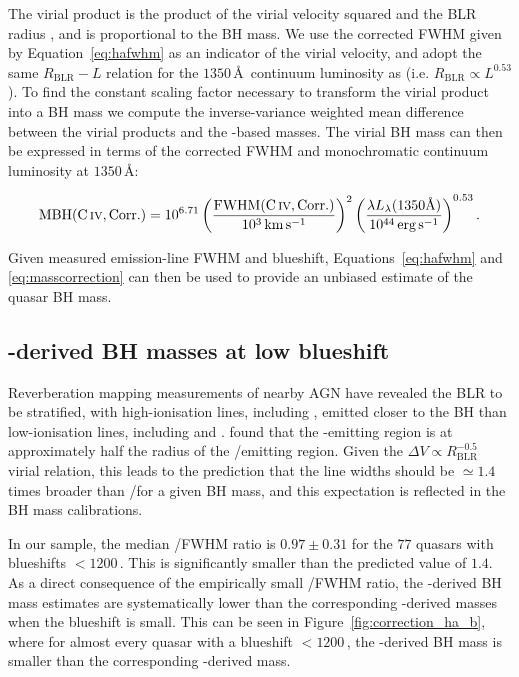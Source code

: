 The virial product is the product of the virial velocity squared and the BLR radius \citep[e.g.][]{shen13}, and is proportional to the BH mass. 
We use the corrected  FWHM given by Equation~\ref{eq:hafwhm} as an indicator of the virial velocity, and adopt the same $R_{\text{BLR}}-L$ relation for the $1350$\,\AA\, continuum luminosity as \citet{vestergaard06} (i.e. $R_{\text{BLR}} \propto L^{0.53}$). 
To find the constant scaling factor necessary to transform the virial product into a BH mass we compute the inverse-variance weighted mean difference between the virial products and the \hans-based masses. 
The virial BH mass can then be expressed in terms of the corrected  FWHM and monochromatic continuum luminosity at $1350$\,\AA:

\begingroup\makeatletter{}\check@mathfonts
\begin{eqnarray}
  \label{eq:masscorrection}
  \text{MBH}(\text{C}\,\textsc{iv}, \text{Corr.}) = 10^{6.71}\left( \frac{ \text{FWHM}(\text{C}\,\textsc{iv}, \text{Corr.})}{10^3 \,\text{km}\,\text{s}^{-1}} \right)^2 \left( \frac{\lambda L_{\lambda} (1350 \text{\AA}) }{10^{44} \,\text{erg}\,\text{s}^{-1}}  \right)^{0.53}.
\end{eqnarray}
\endgroup

\noindent Given measured  emission-line FWHM and blueshift, Equations~\ref{eq:hafwhm} and \ref{eq:masscorrection} can then be used to provide an unbiased estimate of the quasar BH mass.

\subsection{-derived BH masses at low  blueshift}

Reverberation mapping measurements of nearby AGN have revealed the BLR to be stratified, with high-ionisation lines, including , emitted closer to the BH than low-ionisation lines, including \ha and \hb \citep[e.g.][]{onken02}.
\citet{vestergaard06} found that the -emitting region is at approximately half the radius of the \hbns/\ha emitting region.
Given the $\Delta V \propto R_{\text{BLR}}^{-0.5}$ virial relation, this leads to the prediction that the  line widths should be $\simeq 1.4$ times broader than \hans/\hb for a given BH mass, and this expectation is reflected in the \citet{vestergaard06} BH mass calibrations.

In our sample, the median /\ha FWHM ratio is $0.97 \pm 0.31$ for the $77$ quasars with  blueshifts $<1200$\,\kms.
This is significantly smaller than the predicted value of $1.4$. 
As a direct consequence of the empirically small /\ha FWHM ratio, the -derived BH mass estimates are systematically lower than the corresponding \hans-derived masses when the blueshift is small.
This can be seen in Figure~\ref{fig:correction_ha_b}, where for almost every quasar with a  blueshift $<$$1200$\,\kms, the -derived BH mass is smaller than the corresponding \hans-derived mass.

